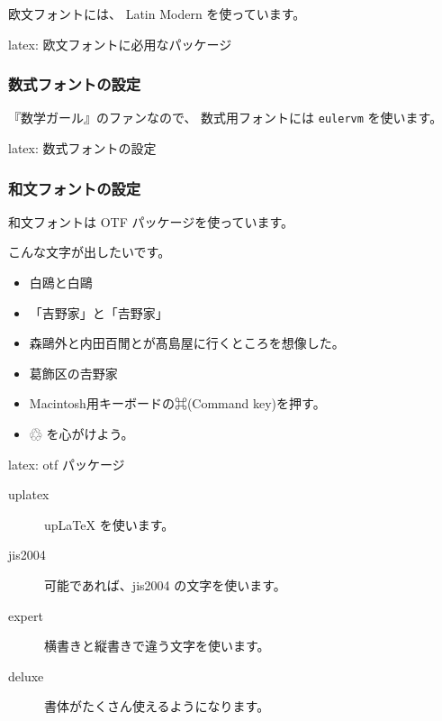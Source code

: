 \documentclass[dvipdfmx,a4j,14pt,uplatex]{jsarticle}
\begin{document}
欧文フォントには、 Latin Modern を使っています。

\begin{programlist}[label={org3b3fb10}]{latex}{: 欧文フォントに必用なパッケージ}\usepackage[T1]{fontenc}
\usepackage{textcomp}
\usepackage[lmr]{mathcomp}
\usepackage[utf8]{inputenc}
\usepackage{lmodern} %
\end{programlist}
\subsubsection{数式フォントの設定}
\label{sec:org574adfc}
『数学ガール』のファンなので、
数式用フォントには \texttt{eulervm} を使います。

\begin{programlist}[label={org29276c1}]{latex}{: 数式フォントの設定}%
\usepackage{eulervm}
\end{programlist}

\subsubsection{和文フォントの設定}
\label{sec:orgdef2485}
和文フォントは OTF パッケージを使っています。

こんな文字が出したいです。

\begin{itemize}
\item 白鴎と白鷗
\item 「吉野家」と「𠮷野家」
\item 森鷗外と内田百閒とが髙島屋に行くところを想像した。
\item 葛飾区の𠮷野家
\item Macintosh用キーボードの⌘(Command key)を押す。
\item ♲ を心がけよう。
\end{itemize}

\begin{programlist}[label={org694b561}]{latex}{: otf パッケージ}\usepackage[uplatex,jis2004,expert,deluxe]{otf}
\end{programlist}

\begin{description}
\item[{uplatex}] upLaTeX を使います。
\item[{jis2004}] 可能であれば、jis2004 の文字を使います。
\item[{expert }] 横書きと縦書きで違う文字を使います。
\item[{deluxe }] 書体がたくさん使えるようになります。
\end{description}
\end{document}

